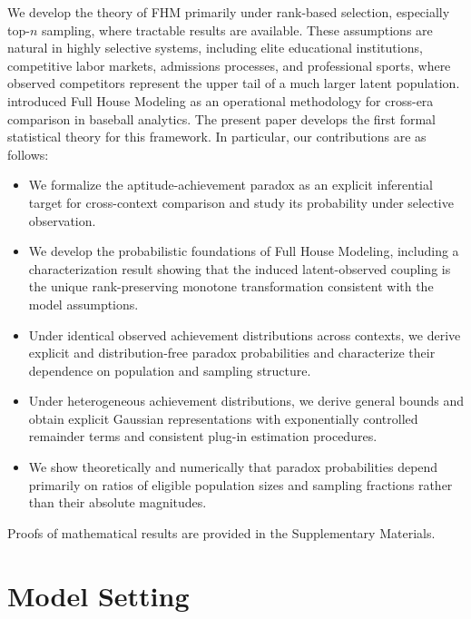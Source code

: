 \documentclass[12pt]{article}
\begin{document}
We develop the theory of FHM primarily under rank-based selection, especially top-$n$ sampling, where tractable results are available. These assumptions are natural in highly selective systems, including elite educational institutions, competitive labor markets, admissions processes, and professional sports, where observed competitors represent the upper tail of a much larger latent population. \citet{yan2025comparing} introduced Full House Modeling as an operational methodology for cross-era comparison in baseball analytics. The present paper develops the first formal statistical theory for this framework. In particular, our contributions are as follows:
\begin{itemize}
    \item We formalize the aptitude-achievement paradox as an explicit inferential target for cross-context comparison and study its probability under selective observation.
    \item We develop the probabilistic foundations of Full House Modeling, including a characterization result showing that the induced latent-observed coupling is the unique rank-preserving monotone transformation consistent with the model assumptions.
    \item Under identical observed achievement distributions across contexts, we derive explicit and distribution-free paradox probabilities and characterize their dependence on population and sampling structure.
	\item Under heterogeneous achievement distributions, we derive general bounds and obtain explicit Gaussian representations with exponentially controlled remainder terms and consistent plug-in estimation procedures.
    \item We show theoretically and numerically that paradox probabilities depend primarily on ratios of eligible population sizes and sampling fractions rather than their absolute magnitudes.
\end{itemize}

Proofs of mathematical results are provided in the Supplementary Materials.



\section{Model Setting}
\label{sec:modelsetting}
\end{document}
